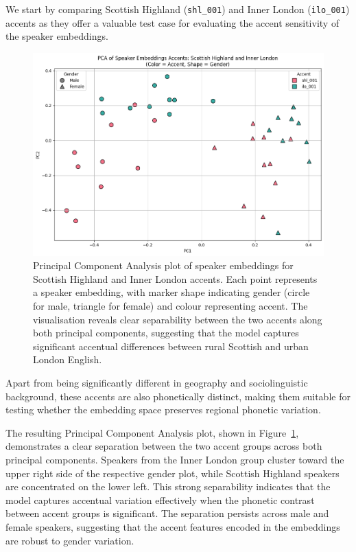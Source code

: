 \documentclass[conference]{IEEEtran}
\begin{document}
	We start by comparing  Scottish Highland (\texttt{shl\_001}) and Inner London (\texttt{ilo\_001}) accents as they offer a valuable test case for evaluating the accent sensitivity of the speaker embeddings. 
	
	
	\begin{figure}[H]
		\centering
		\includegraphics[width=0.7\linewidth]{img/img-cluster-shl-ilo}
		\caption{Principal Component Analysis plot of speaker embeddings for Scottish Highland and Inner London  accents. Each point represents a speaker embedding, with marker shape indicating gender (circle for male, triangle for female) and colour representing accent. The visualisation reveals clear separability between the two accents along both principal components, suggesting that the model captures significant accentual differences between rural Scottish and urban London English.}
		\label{fig:img-cluster-shl-ilo}
	\end{figure}
	
	
	Apart from being significantly different in geography and sociolinguistic background, these accents are also phonetically distinct, making them suitable for testing whether the embedding space preserves regional phonetic variation.
	
	The resulting Principal Component Analysis plot, shown in Figure~\ref{fig:img-cluster-shl-ilo}, demonstrates a clear separation between the two accent groups across both principal components. Speakers from the Inner London group cluster toward the upper right side of the respective gender plot, while Scottish Highland speakers are concentrated on the lower left. This strong separability indicates that the model captures accentual variation effectively when the phonetic contrast between accent groups is significant. The separation persists across male and female speakers, suggesting that the accent features encoded in the embeddings are robust to gender variation.
	
\end{document}
